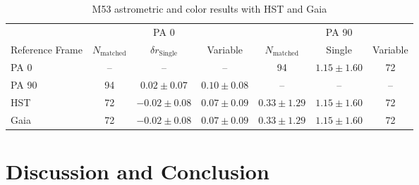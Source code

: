 \documentclass[]{spie}  %
\begin{document}
\begin{table}[!h]
\caption{M53 astrometric and color results with HST and Gaia}
\setlength{\tabcolsep}{8.0pt}
\begin{center}
\begin{tabular}{lcccccc}
    \hline\hline
    {} & {} & \multicolumn{1}{c}{PA 0} & {} & {} & \multicolumn{1}{c}{PA 90}\\
    \cmidrule(lr){2-4}\cmidrule(l){5-7}
        Reference Frame & $N_{\textrm{matched}}$ & $\delta r_{\textrm{Single}}$ & Variable & $N_{\textrm{matched}}$ & Single & Variable\\
        \hline
        PA 0 & -- &  -- & -- & 94 & $1.15 \pm 1.60$ & 72\\
        PA 90 & 94 & $0.02 \pm 0.07$ & $0.10 \pm 0.08$ & -- & -- & --\\
        HST & 72 &  $-0.02 \pm 0.08$ & $0.07 \pm 0.09$ & $0.33 \pm 1.29$ & $1.15 \pm 1.60$ & 72\\
        Gaia & 72 &  $-0.02 \pm 0.08$ & $0.07 \pm 0.09$ & $0.33 \pm 1.29$ & $1.15 \pm 1.60$ & 72\\\hline
\end{tabular}
\end{center}
\label{tab:m53-AstromColor-results}
\end{table}

\section{Discussion and Conclusion} \label{sec:conclusion}
\end{document}
